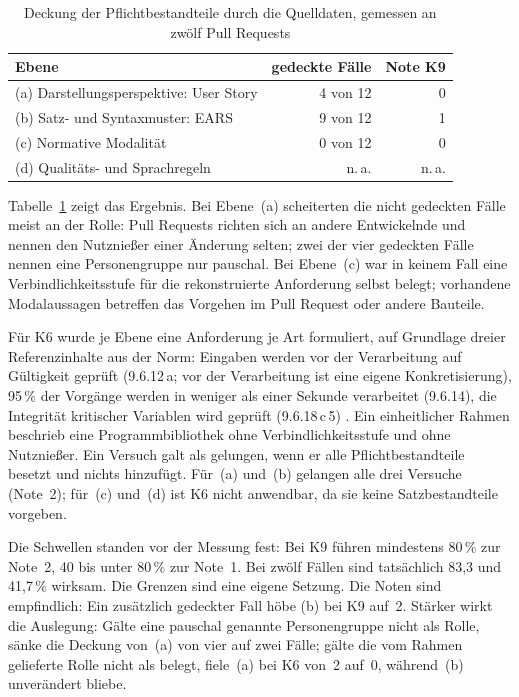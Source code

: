 \documentclass[11pt,a4paper]{report}
\begin{document}
\begin{table}[htbp]
  \centering
  \caption{Deckung der Pflichtbestandteile durch die Quelldaten,
           gemessen an zwölf Pull Requests}
  \label{tab:deckung}
  \begin{tabular}{@{}>{\raggedright\arraybackslash}p{6.0cm}rr@{}}
    \toprule
    \textbf{Ebene} & \textbf{gedeckte Fälle} & \textbf{Note K9} \\
    \midrule
    (a) Darstellungsperspektive: User Story & 4 von 12 & 0 \\
    (b) Satz- und Syntaxmuster: EARS        & 9 von 12 & 1 \\
    (c) Normative Modalität                 & 0 von 12 & 0 \\
    (d) Qualitäts- und Sprachregeln         & n.\,a.   & n.\,a. \\
    \bottomrule
  \end{tabular}
\end{table}

Tabelle~\ref{tab:deckung} zeigt das Ergebnis. Bei Ebene~(a) scheiterten
die nicht gedeckten Fälle meist an der Rolle: Pull Requests richten sich
an andere Entwickelnde und nennen den Nutznießer einer Änderung selten;
zwei der vier gedeckten Fälle nennen eine Personengruppe nur pauschal.
Bei Ebene~(c) war in keinem Fall eine Verbindlichkeitsstufe für die
rekonstruierte Anforderung selbst belegt; vorhandene Modalaussagen
betreffen das Vorgehen im Pull Request oder andere Bauteile.

Für K6 wurde je Ebene eine Anforderung je Art formuliert, auf Grundlage
dreier Referenzinhalte aus der Norm: Eingaben werden vor der
Verarbeitung auf Gültigkeit geprüft (9.6.12\,a; \glqq vor der
Verarbeitung\grqq{} ist eine eigene Konkretisierung), 95\,\% der Vorgänge
werden in weniger als einer Sekunde verarbeitet (9.6.14), die
Integrität kritischer Variablen wird geprüft (9.6.18\,c\,5)
\cite[Abschn.~9.6.12, 9.6.14 und 9.6.18]{iso29148}. Ein einheitlicher
Rahmen beschrieb eine Programmbibliothek ohne Verbindlichkeitsstufe und
ohne Nutznießer. Ein Versuch galt als gelungen, wenn er alle
Pflichtbestandteile besetzt und nichts hinzufügt. Für~(a) und~(b)
gelangen alle drei Versuche (Note~2); für~(c) und~(d) ist K6 nicht
anwendbar, da sie keine Satzbestandteile vorgeben.

Die Schwellen standen vor der Messung fest: Bei K9 führen mindestens
80\,\% zur Note~2, 40 bis unter 80\,\% zur Note~1. Bei zwölf Fällen sind
tatsächlich 83,3 und 41,7\,\% wirksam. Die Grenzen sind eine eigene
Setzung. Die Noten sind empfindlich: Ein zusätzlich gedeckter Fall höbe
(b) bei K9 auf~2. Stärker wirkt die Auslegung: Gälte eine pauschal
genannte Personengruppe nicht als Rolle, sänke die Deckung von~(a) von
vier auf zwei Fälle; gälte die vom Rahmen gelieferte Rolle nicht als
belegt, fiele~(a) bei K6 von~2 auf~0, während~(b) unverändert bliebe.
\end{document}
